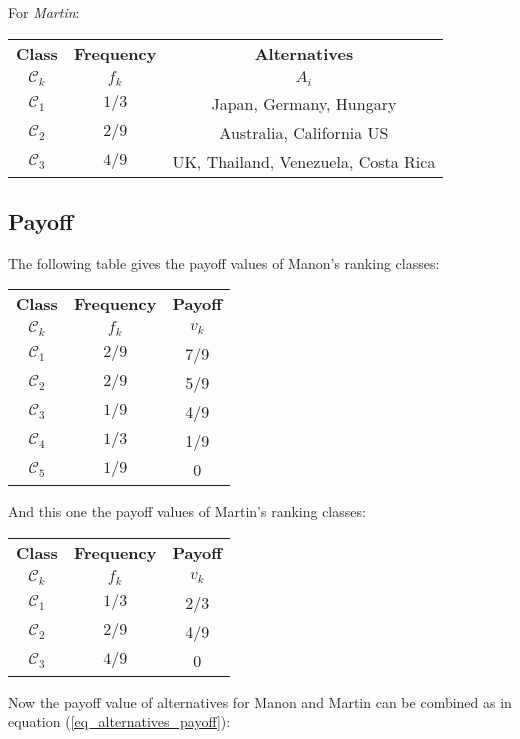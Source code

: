 \documentclass[12pt,a4paper]{article}
\begin{document}
For \textsl{Martin}:

\begin{tabular}{|c|c|c|}
\hline
\textbf{Class}&\textbf{Frequency} &\textbf{Alternatives}\\
$\mathcal{C}_k$ & $f_k$ & $A_i$ \\
\hline
$\mathcal{C}_1$ & $1/3$ & Japan, Germany, Hungary \\
$\mathcal{C}_2$ & $2/9$ & Australia, California US \\
$\mathcal{C}_3$ & $4/9$ & UK, Thailand, Venezuela, Costa Rica \\
\hline
\end{tabular}

\subsection{Payoff}

The following table gives the payoff values of Manon's ranking classes:

\begin{tabular}{|c|c|c|}
\hline
\textbf{Class}&\textbf{Frequency} &\textbf{Payoff}\\
$\mathcal{C}_k$ & $f_k$ & $v_k$ \\
\hline
$\mathcal{C}_1$ & $2/9$ & 7/9 \\
$\mathcal{C}_2$ & $2/9$ & 5/9 \\
$\mathcal{C}_3$ & $1/9$ & 4/9 \\
$\mathcal{C}_4$ & $1/3$ & 1/9 \\
$\mathcal{C}_5$ & $1/9$ & 0 \\
\hline
\end{tabular}

And this one the payoff values of Martin's ranking classes:

\begin{tabular}{|c|c|c|}
\hline
\textbf{Class}&\textbf{Frequency} &\textbf{Payoff}\\
$\mathcal{C}_k$ & $f_k$ & $v_k$ \\
\hline
$\mathcal{C}_1$ & $1/3$ & 2/3  \\
$\mathcal{C}_2$ & $2/9$ & 4/9 \\
$\mathcal{C}_3$ & $4/9$ & 0 \\
\hline
\end{tabular}

Now the payoff value of alternatives for Manon and Martin can be combined as in equation (\ref{eq_alternatives_payoff}):
\end{document}
